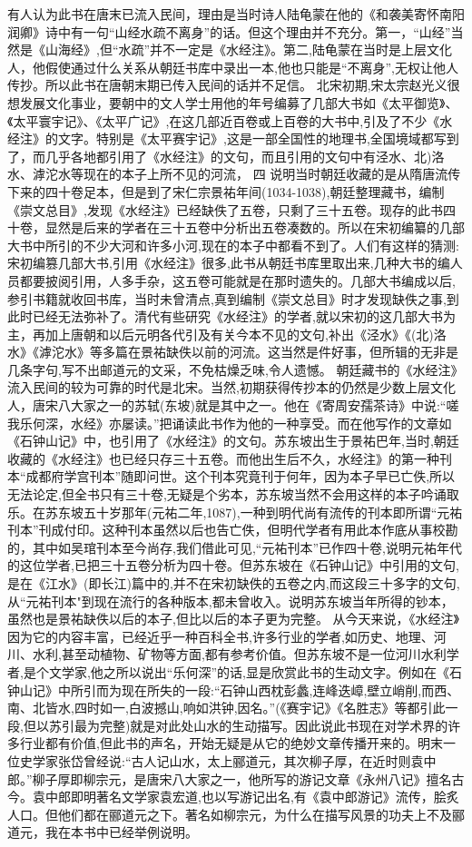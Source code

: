 \documentclass[12pt,UTF8]{ctexbook}
\begin{document}
有人认为此书在唐末已流入民间，理由是当时诗人陆龟蒙在他的《和袭美寄怀南阳润卿》诗中有一句“山经水疏不离身”的话。但这个理由并不充分。第一，“山经”当然是《山海经》,但“水疏”并不一定是《水经注》。第二,陆龟蒙在当时是上层文化人，他假使通过什么关系从朝廷书库中录出一本,他也只能是“不离身”,无权让他人传抄。所以此书在唐朝末期已传入民间的话并不足信。
北宋初期,宋太宗赵光义很想发展文化事业，要朝中的文人学士用他的年号编募了几部大书如《太平御览》、《太平寰宇记》、《太平广记》,在这几部近百卷或上百卷的大书中,引及了不少《水经注》的文字。特别是《太平赛宇记》,这是一部全国性的地理书,全国境域都写到了，而几乎各地都引用了《水经注》的文句，而且引用的文句中有泾水、北)洛水、滹沱水等现在的本子上所不见的河流，
四
说明当时朝廷收藏的是从隋唐流传下来的四十卷足本，但是到了宋仁宗景祐年间(1034-1038),朝廷整理藏书，编制《崇文总目》,发现《水经注》已经缺佚了五卷，只剩了三十五卷。现存的此书四十卷，显然是后来的学者在三十五卷中分析出五卷凑数的。所以在宋初编纂的几部大书中所引的不少大河和许多小河,现在的本子中都看不到了。人们有这样的猜测:宋初编篡几部大书,引用《水经注》很多,此书从朝廷书库里取出来,几种大书的编人员都要披阅引用，人多手杂，这五卷可能就是在那时遗失的。几部大书编成以后,参引书籍就收回书库，当时未曾清点,真到编制《崇文总目》时才发现缺佚之事,到此时已经无法弥补了。清代有些研究《水经注》的学者,就以宋初的这几部大书为主，再加上唐朝和以后元明各代引及有关今本不见的文句,补出《泾水》《(北)洛水》《滹沱水》等多篇在景祐缺佚以前的河流。这当然是件好事，但所辑的无非是几条字句,写不出邮道元的文采，不免枯燥乏味,令人遗憾。
朝廷藏书的《水经注》流入民间的较为可靠的时代是北宋。当然,初期获得传抄本的仍然是少数上层文化人，唐宋八大家之一的苏轼(东坡)就是其中之一。他在《寄周安孺茶诗》中说:“嗟我乐何深，水经》亦屡读。”把诵读此书作为他的一种享受。而在他写作的文章如《石钟山记》中，也引用了《水经注》的文句。苏东坡出生于景祐巴年,当时,朝廷收藏的《水经注》也已经只存三十五卷。而他出生后不久，水经注》的第一种刊本“成都府学宫刊本”随即问世。这个刊本究竟刊于何年，因为本子早已亡佚,所以无法论定,但全书只有三十卷,无疑是个劣本，苏东坡当然不会用这样的本子吟诵取乐。在苏东坡五十岁那年(元祐二年,1087),一种到明代尚有流传的刊本即所谓“元祐刊本”刊成付印。这种刊本虽然以后也告亡佚，但明代学者有用此本作底从事校勘的，其中如吴琯刊本至今尚存,我们借此可见,“元祐刊本”已作四十卷,说明元祐年代的这位学者,已把三十五卷分析为四十卷。但苏东坡在《石钟山记》中引用的文句,是在《江水》(即长江)篇中的,并不在宋初缺佚的五卷之内,而这段三十多字的文句,从“元祐刊本"到现在流行的各种版本,都未曾收入。说明苏东坡当年所得的钞本，虽然也是景祐缺佚以后的本子,但比以后的本子更为完整。
从今天来说，《水经注》因为它的内容丰富，已经近乎一种百科全书,许多行业的学者,如历史、地理、河川、水利,甚至动植物、矿物等方面,都有参考价值。但苏东坡不是一位河川水利学者,是个文学家,他之所以说出“乐何深”的话,显是欣赏此书的生动文字。例如在《石钟山记》中所引而为现在所失的一段:“石钟山西枕彭蠡,连峰迭嶂,壁立峭削,而西、南、北皆水,四时如一,白波撼山,响如洪钟,因名。”(《赛宇记》《名胜志》等都引此一段,但以苏引最为完整)就是对此处山水的生动描写。因此说此书现在对学术界的许多行业都有价值,但此书的声名，开始无疑是从它的绝妙文章传播开来的。明末一位史学家张岱曾经说:“古人记山水，太上郦道元，其次柳子厚，在近时则袁中郎。”柳子厚即柳宗元，是唐宋八大家之一，他所写的游记文章《永州八记》擅名古今。袁中郎即明著名文学家袁宏道,也以写游记出名,有《袁中郎游记》流传，脍炙人口。但他们都在郦道元之下。著名如柳宗元，为什么在描写风景的功夫上不及郦道元，我在本书中已经举例说明。
\end{document}
